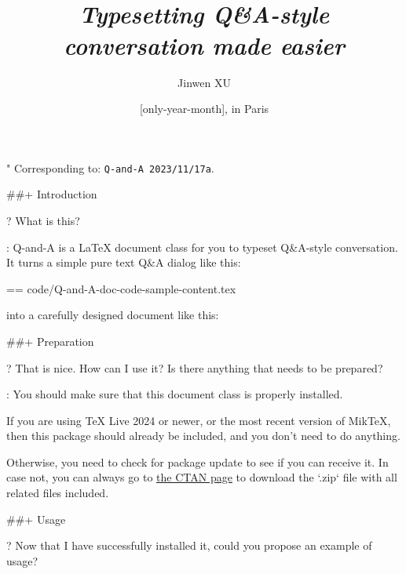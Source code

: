 \documentclass[%
  use style = classical,
  scroll,
]{Q-and-A}
\title{\QApackage{}\\\smallskip\itshape Typesetting Q\&A-style conversation made easier}
\author{Jinwen XU}
\date{\TheDate{\PackageVersion}[only-year-month], in Paris}
\def\PackageVersion{2023/11/17}
\def\PackageSubVersion{a}
\newcommand{\QApackage}{{\normalfont\textsf{Q-and-A}}}
\begin{document}
\maketitle

"
  Corresponding to: {\normalfont\texttt{\QApackage{}~\PackageVersion\PackageSubVersion}}.


##+ {Introduction}

?
  What is this?

:
  \QApackage{} is a \LaTeX{} document class for you to typeset Q\&A-style conversation. It turns a simple pure text Q\&A dialog like this:

  == {code/Q-and-A-doc-code-sample-content.tex}

  into a carefully designed document like this:

  \begin{center}
  \end{center}


##+ {Preparation}

?
  That is nice. How can I use it? Is there anything that needs to be prepared?

:
  You should make sure that this document class is properly installed.

  If you are using TeX Live 2024 or newer, or the most recent version of MikTeX, then this package should already be included, and you don't need to do anything.

  Otherwise, you need to check for package update to see if you can receive it. In case not, you can always go to \href{https://ctan.org/pkg/Q-and-A}{the CTAN page} to download the `.zip` file with all related files included.


##+ {Usage}

?
  Now that I have successfully installed it, could you propose an example of usage?
\end{document}
